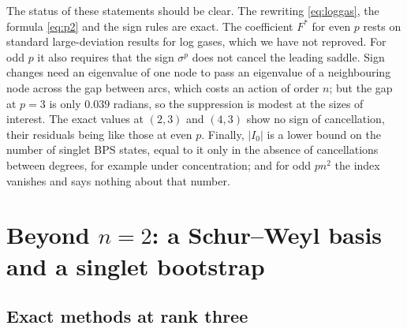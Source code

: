 \documentclass[10pt]{article}
\begin{document}
The status of these statements should be clear. The rewriting \eqref{eq:loggas}, the formula \eqref{eq:p2} and the
sign rules are exact. The coefficient $F^*$ for even $p$ rests on standard large-deviation results for log gases,
which we have not reproved. For odd $p$ it also requires that the sign $\sigma^p$ does not cancel the leading saddle.
Sign changes need an eigenvalue of one node to pass an eigenvalue of a neighbouring node across the gap between arcs,
which costs an action of order $n$; but the gap at $p=3$ is only $0.039$ radians, so the suppression is modest at the
sizes of interest. The exact values at $(2,3)$ and $(4,3)$ show no sign of cancellation, their residuals being like
those at even $p$. Finally, $|I_0|$ is a lower bound on the number of singlet BPS states, equal to it only in the
absence of cancellations between degrees, for example under concentration; and for odd $pn^2$ the index vanishes and
says nothing about that number.

\section{\texorpdfstring{Beyond $n=2$: a Schur--Weyl basis and a singlet bootstrap}{Beyond n=2: a Schur-Weyl basis and a singlet bootstrap}}\label{sec:boot}

\subsection{Exact methods at rank three}
\end{document}
